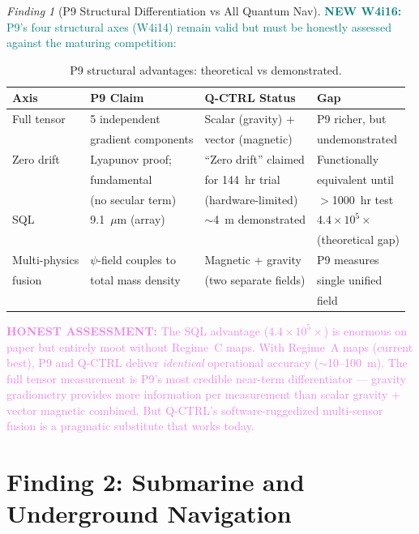 \documentclass[11pt]{article}
\theoremstyle{definition}
\theoremstyle{remark}
\newtheorem{finding}[theorem]{Finding}
\newcommand{\ee}[1]{\times10^{#1}}
\newcommand{\honest}[1]{\textcolor{violet}{\textbf{HONEST ASSESSMENT:} #1}}
\newcommand{\newfinding}[1]{\textcolor{teal}{\textbf{NEW W4i16:} #1}}
\begin{document}
\begin{finding}[P9 Structural Differentiation vs All Quantum Nav]
\label{find:differentiation}
\newfinding{P9's four structural axes (W4i14) remain valid but must
be honestly assessed against the maturing competition:}

\begin{table}[H]
\centering
\caption{P9 structural advantages: theoretical vs demonstrated.}
\label{tab:structural-axes}
\begin{tabular}{@{}p{2.5cm}p{3.5cm}p{3.5cm}p{3cm}@{}}
\toprule
Axis & P9 Claim & Q-CTRL Status & Gap \\
\midrule
Full tensor & 5 independent & Scalar (gravity) + & P9 richer, but \\
 & gradient components & vector (magnetic) & undemonstrated \\
\midrule
Zero drift & Lyapunov proof; & ``Zero drift'' claimed & Functionally \\
 & fundamental & for 144~hr trial & equivalent until \\
 & (no secular term) & (hardware-limited) & $>$1000~hr test \\
\midrule
SQL & 9.1~$\mu$m (array) & $\sim$4~m demonstrated & $4.4\ee{5}\times$ \\
 & & & (theoretical gap) \\
\midrule
Multi-physics & $\psi$-field couples to & Magnetic + gravity & P9 measures \\
fusion & total mass density & (two separate fields) & single unified \\
 & & & field \\
\bottomrule
\end{tabular}
\end{table}

\honest{The SQL advantage ($4.4\ee{5}\times$) is enormous on paper
but entirely moot without Regime~C maps. With Regime~A maps
(current best), P9 and Q-CTRL deliver \emph{identical} operational
accuracy ($\sim$10--100~m). The full tensor measurement is P9's
most credible near-term differentiator --- gravity gradiometry
provides more information per measurement than scalar gravity +
vector magnetic combined. But Q-CTRL's software-ruggedized
multi-sensor fusion is a pragmatic substitute that works today.}
\end{finding}

\part{Finding 2: Submarine and Underground Navigation}
\label{part:submarine}
\end{document}
